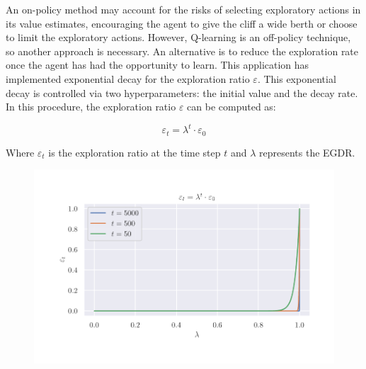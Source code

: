 \documentclass[]{final_report}
\begin{document}
An on-policy method may account for the risks of selecting exploratory actions in its value estimates, encouraging the agent to give the cliff a wide berth or choose to limit the exploratory actions. However, Q-learning is an off-policy technique, so another approach is necessary. An alternative is to reduce the exploration rate once the agent has had the opportunity to learn. This application has implemented exponential decay for the exploration ratio $\varepsilon$. This exponential decay is controlled via two hyperparameters: the initial value and the decay rate. In this procedure, the exploration ratio $\varepsilon$ can be computed as: 

\begin{equation}
  \varepsilon_t = \lambda^t \cdot \varepsilon_0
\end{equation}

Where $\varepsilon_t$ is the exploration ratio at the time step $t$ and $\lambda$ represents the EGDR.

  
  

\begin{figure}[H]
  \centering
  
  \includegraphics[trim={0 1cm 0 1cm},clip, width=\textwidth]{hyper-paramiters/example-curve.pdf}
  
  \caption{\label{fig:example-curve}}
\end{figure}
\end{document}
